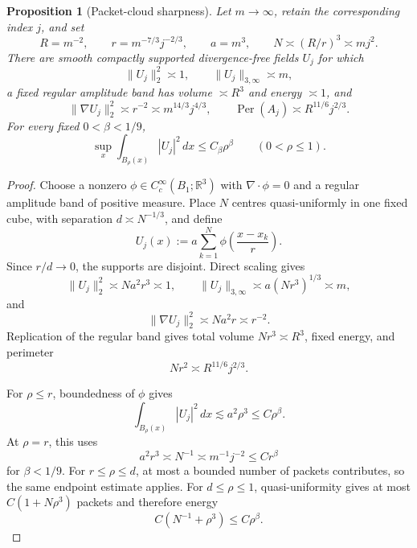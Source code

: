 \documentclass[11pt]{article}
\newtheorem{proposition}[theorem]{Proposition}
\theoremstyle{remark}
\newcommand{\R}{\mathbb R}
\newcommand{\Per}{\operatorname{Per}}
\begin{document}
\begin{proposition}[Packet-cloud sharpness]
\label{prop:packets}
Let \(m\to\infty\), retain the corresponding index \(j\), and set
\begin{equation}
 \label{eq:packet-ledger}
 R=m^{-2},
 \qquad
 r=m^{-7/3}j^{-2/3},
 \qquad
 a=m^3,
 \qquad
 N\asymp(R/r)^3\asymp mj^2.
\end{equation}
There are smooth compactly supported divergence-free fields \(U_j\)
for which
\begin{equation}
 \label{eq:packet-norms}
 \|U_j\|_2^2\asymp1,
 \qquad
 \|U_j\|_{3,\infty}\asymp m,
\end{equation}
a fixed regular amplitude band has volume \(\asymp R^3\) and energy
\(\asymp1\), and
\begin{equation}
 \label{eq:packet-costs}
 \|\nabla U_j\|_2^2
 \asymp r^{-2}
 \asymp m^{14/3}j^{4/3},
 \qquad
 \Per(A_j)\asymp R^{11/6}j^{2/3}.
\end{equation}
For every fixed \(0<\beta<1/9\),
\begin{equation}
 \label{eq:packet-morrey}
 \sup_x\int_{B_\rho(x)}|U_j|^2\,dx
 \leq C_\beta\rho^\beta
 \qquad(0<\rho\leq1).
\end{equation}
\end{proposition}

\begin{proof}
Choose a nonzero
\(\phi\in C_c^\infty(B_1;\R^3)\) with
\(\nabla\cdot\phi=0\) and a regular amplitude band of positive measure.
Place \(N\) centres quasi-uniformly in one fixed cube, with separation
\(d\asymp N^{-1/3}\), and define
\[
 U_j(x):=
 a\sum_{k=1}^N
 \phi\left(\frac{x-x_k}{r}\right).
\]
Since \(r/d\to0\), the supports are disjoint.  Direct scaling gives
\[
 \|U_j\|_2^2\asymp Na^2r^3\asymp1,
 \qquad
 \|U_j\|_{3,\infty}\asymp a(Nr^3)^{1/3}\asymp m,
\]
and
\[
 \|\nabla U_j\|_2^2\asymp Na^2r\asymp r^{-2}.
\]
Replication of the regular band gives total volume
\(Nr^3\asymp R^3\), fixed energy, and perimeter
\[
 Nr^2\asymp R^{11/6}j^{2/3}.
\]

For \(\rho\leq r\), boundedness of \(\phi\) gives
\[
 \int_{B_\rho(x)}|U_j|^2\,dx
 \lesssim a^2\rho^3\leq C\rho^\beta.
\]
At \(\rho=r\), this uses
\[
 a^2r^3\asymp N^{-1}
 \asymp m^{-1}j^{-2}\leq Cr^\beta
\]
for \(\beta<1/9\).  For \(r\leq\rho\leq d\), at most a bounded number of
packets contributes, so the same endpoint estimate applies.  For
\(d\leq\rho\leq1\), quasi-uniformity gives at most
\(C(1+N\rho^3)\) packets and therefore energy
\[
 C(N^{-1}+\rho^3)\leq C\rho^\beta.
\]
\end{proof}
\end{document}
